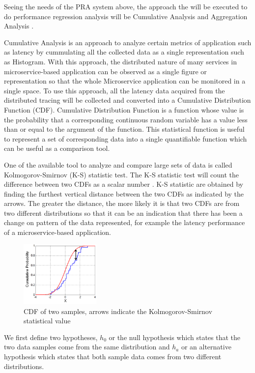 \documentclass[conference]{configs/IEEEtran}
\begin{document}
Seeing the needs of the PRA system above, the approach the will be executed to do performance regression analysis will be Cumulative Analysis and Aggregation Analysis \cite{parker2020distributed}. 

Cumulative Analysis is an approach to analyze certain metrics of application such as latency by cummulating all the collected data as a single representation such as Histogram. With this approach, the distributed nature of many services in microservice-based application can be observed as a single figure or representation so that the whole Microservice application can be monitored in a single space. To use this approach, all the latency data acquired from the distributed tracing will be collected and converted into a Cumulative Distribution Function (CDF). Cumulative Distribution Function is a function whose value is the probability that a corresponding continuous random variable has a value less than or equal to the argument of the function. This statistical function is useful to represent a set of corresponding data into a single quantifiable function which can be useful as a comparison tool. 

One of the available tool to analyze and compare large sets of data is called Kolmogorov-Smirnov (K-S) statistic test. The K-S statistic test will count the difference between two CDFs as a scalar number \cite{kolmogorov_1951}. K-S statistic are obtained by finding the furthest vertical distance between the two CDFs as indicated by the arrows. The greater the distance, the more likely it is that two CDFs are from two different distributions so that it can be an indication that there has been a change on pattern of the data represented, for example the latency performance of a microservice-based application.
\begin{figure}[htb]
	\centering
	\includegraphics[width=0.35\textwidth]{resources/ch2/ks.png}
	\caption{CDF of two samples, arrows indicate the Kolmogorov-Smirnov statistical value \cite{wiki:ks-test}}
	\label{ks-example}
\end{figure}

We first define two hypotheses, $h_{0}$ or the null hypothesis which states that the two data samples come from the same distribution and $h_{a}$ or an alternative hypothesis which states that both sample data comes from two different distributions.
\end{document}
